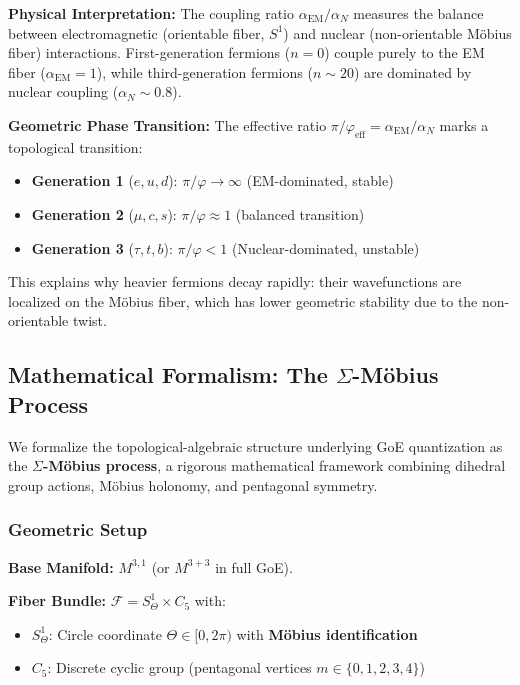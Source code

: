\documentclass[12pt]{article}
\begin{document}
\textbf{Physical Interpretation:} The coupling ratio $\alpha_{\text{EM}}/\alpha_N$ measures the balance between electromagnetic (orientable fiber, $S^1$) and nuclear (non-orientable M\"obius fiber) interactions. First-generation fermions ($n=0$) couple purely to the EM fiber ($\alpha_{\text{EM}} = 1$), while third-generation fermions ($n \sim 20$) are dominated by nuclear coupling ($\alpha_N \sim 0.8$).

\textbf{Geometric Phase Transition:} The effective ratio $\pi/\varphi_{\text{eff}} = \alpha_{\text{EM}}/\alpha_N$ marks a topological transition:

\begin{itemize}
\item \textbf{Generation 1} ($e, u, d$): $\pi/\varphi \to \infty$ (EM-dominated, stable)
\item \textbf{Generation 2} ($\mu, c, s$): $\pi/\varphi \approx 1$ (balanced transition)
\item \textbf{Generation 3} ($\tau, t, b$): $\pi/\varphi < 1$ (Nuclear-dominated, unstable)
\end{itemize}

This explains why heavier fermions decay rapidly: their wavefunctions are localized on the M\"obius fiber, which has lower geometric stability due to the non-orientable twist.

\subsection{Mathematical Formalism: The $\Sigma$-M\"obius Process}
\label{sec:sigma_moebius}

We formalize the topological-algebraic structure underlying GoE quantization as the \textbf{$\Sigma$-M\"obius process}, a rigorous mathematical framework combining dihedral group actions, M\"obius holonomy, and pentagonal symmetry.

\subsubsection{Geometric Setup}

\textbf{Base Manifold:} $M^{3,1}$ (or $M^{3+3}$ in full GoE).

\textbf{Fiber Bundle:} $\mathcal{F} = S^1_\Theta \times C_5$ with:
\begin{itemize}
\item $S^1_\Theta$: Circle coordinate $\Theta \in [0, 2\pi)$ with \textbf{M\"obius identification}
\item $C_5$: Discrete cyclic group (pentagonal vertices $m \in \{0,1,2,3,4\}$)
\end{itemize}
\end{document}
